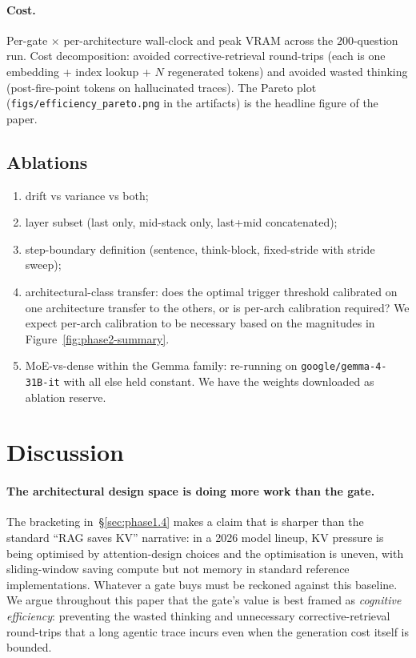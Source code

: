 \documentclass[11pt,letterpaper]{article}
\begin{document}
\paragraph{Cost.}
Per-gate $\times$ per-architecture wall-clock and peak VRAM across the
$200$-question run. Cost decomposition: avoided corrective-retrieval
round-trips (each is one embedding + index lookup + $N$ regenerated
tokens) and avoided wasted thinking (post-fire-point tokens on
hallucinated traces). The Pareto plot
(\verb|figs/efficiency_pareto.png| in the artifacts) is the headline
figure of the paper.

\subsection{Ablations}
\label{sec:phase4-ablations}

\begin{enumerate}[label=(\alph*), leftmargin=*]
\item drift vs variance vs both;
\item layer subset (last only, mid-stack only, last+mid concatenated);
\item step-boundary definition (sentence, think-block, fixed-stride
with stride sweep);
\item architectural-class transfer: does the optimal trigger threshold
calibrated on one architecture transfer to the others, or is per-arch
calibration required? We expect per-arch calibration to be necessary
based on the magnitudes in Figure~\ref{fig:phase2-summary}.
\item MoE-vs-dense within the Gemma family: re-running on
\texttt{google/gemma-4-31B-it} with all else held constant. We have the
weights downloaded as ablation reserve.
\end{enumerate}

\section{Discussion}
\label{sec:discussion}

\paragraph{The architectural design space is doing more work than the gate.}
The bracketing in~\S\ref{sec:phase1.4} makes a claim that is sharper
than the standard ``RAG saves KV'' narrative: in a 2026 model lineup,
KV pressure is being optimised by attention-design choices and the
optimisation is uneven, with sliding-window saving compute but not
memory in standard reference implementations. Whatever a gate buys must
be reckoned against this baseline. We argue throughout this paper that
the gate's value is best framed as \emph{cognitive efficiency}:
preventing the wasted thinking and unnecessary corrective-retrieval
round-trips that a long agentic trace incurs even when the
generation cost itself is bounded.
\end{document}
